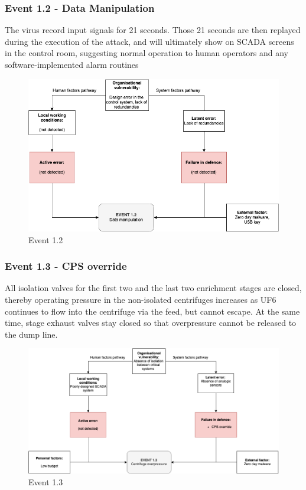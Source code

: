 \documentclass[12pt]{article}
\begin{document}
    \subsubsection{Event 1.2 - Data Manipulation}
    The virus record input signals for 21 seconds. Those 21 seconds are then replayed during the execution of the attack, and will ultimately show on SCADA screens in the control room, suggesting normal operation to human operators and any software-implemented alarm routines
        \begin{figure}[H]
        \centering
        \includegraphics[height=0.6\textwidth]{event12.png}
        \caption{Event 1.2}
        \label{fig:event12}
        \end{figure}
        
    \subsubsection{Event 1.3 - CPS override}
    All isolation valves for the first two and the last two enrichment stages are closed, thereby operating pressure in the non-isolated centrifuges increases as UF6 continues to flow into the centrifuge via the feed, but cannot escape. At the same time, stage exhaust valves stay closed so that overpressure cannot be released to the dump line.
        \begin{figure}[H]
        \centering
        \includegraphics[height=0.6\textwidth]{event13.png}
        \caption{Event 1.3}
        \label{fig:event13}
        \end{figure}
        
\end{document}
